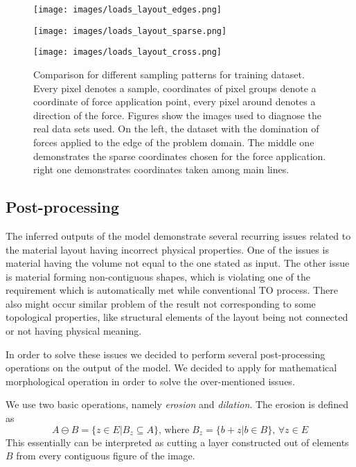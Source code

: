 \begin{figure*}
\begin{multicols}{3}
	\texttt{[image: images/loads\_layout\_edges.png]}\par
	\texttt{[image: images/loads\_layout\_sparse.png]}\par
	\texttt{[image: images/loads\_layout\_cross.png]}\par
\end{multicols}
\label{fig:sampling_layout}
\caption{Comparison for different sampling patterns for training dataset. Every pixel denotes a sample, coordinates of pixel groups denote a coordinate of force application point, every pixel around denotes a direction of the force. Figures show the images used to diagnose the real data sets used. On the left, the dataset with the domination of forces applied to the edge of the problem domain. The middle one demonstrates the sparse coordinates chosen for the force application. right one demonstrates coordinates taken among main lines.   
}
\end{figure*}

 
\subsection{Post-processing}

The inferred outputs of the model demonstrate several recurring issues related to the material layout having incorrect physical properties.
One of the issues is material having the volume not equal to the one stated as input.
The other issue is material forming non-contiguous shapes, which is violating one of the requirement which is automatically met while conventional TO process.
There also might occur similar problem of the result not corresponding to some topological properties, like structural elements of the layout being not connected or not having physical meaning.
\medskip

In order to solve these issues we decided to perform several post-processing operations on the output of the model.
We decided to apply for mathematical morphological operation in order to solve the over-mentioned issues.
\medskip

We use two basic operations, namely \emph{erosion} and \emph{dilation}\cite{}.
The erosion is defined as 
\begin{equation}
A \ominus B = \{z \in E | B_{z} \subseteq A \}, \, \mathrm{where} \; B_{z}=\{ b+z | b \in B \}, \, \forall z \in E 
\end{equation} 
This essentially can be interpreted as cutting a layer constructed out of elements $B$ from every contiguous figure of the image.

